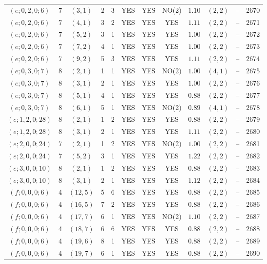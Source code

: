 \begin{longtable}{|c|c|c|c|c|c|c|c|c|c|c|c|}
$(e;0,2,0;6)$ & 7 & $(3,1)$ & 2 & 3 & YES & YES & NO(2) & $1.10$ & $(2,2)$ & -- & 2670\\
$(e;0,2,0;6)$ & 7 & $(4,1)$ & 3 & 2 & YES & YES & YES & $1.11$ & $(2,2)$ & -- & 2671\\
$(e;0,2,0;6)$ & 7 & $(5,2)$ & 3 & 1 & YES & YES & YES & $1.00$ & $(2,2)$ & -- & 2672\\
$(e;0,2,0;6)$ & 7 & $(7,2)$ & 4 & 1 & YES & YES & YES & $1.00$ & $(2,2)$ & -- & 2673\\
$(e;0,2,0;6)$ & 7 & $(9,2)$ & 5 & 3 & YES & YES & YES & $1.11$ & $(2,2)$ & -- & 2674\\
$(e;0,3,0;7)$ & 8 & $(2,1)$ & 1 & 1 & YES & YES & NO(2) & $1.00$ & $(4,1)$ & -- & 2675\\
$(e;0,3,0;7)$ & 8 & $(3,1)$ & 2 & 1 & YES & YES & YES & $1.00$ & $(2,2)$ & -- & 2676\\
$(e;0,3,0;7)$ & 8 & $(5,1)$ & 4 & 1 & YES & YES & YES & $0.88$ & $(2,2)$ & -- & 2677\\
$(e;0,3,0;7)$ & 8 & $(6,1)$ & 5 & 1 & YES & YES & NO(2) & $0.89$ & $(4,1)$ & -- & 2678\\
$(e;1,2,0;28)$ & 8 & $(2,1)$ & 1 & 2 & YES & YES & YES & $0.88$ & $(2,2)$ & -- & 2679\\
$(e;1,2,0;28)$ & 8 & $(3,1)$ & 2 & 1 & YES & YES & YES & $1.11$ & $(2,2)$ & -- & 2680\\
$(e;2,0,0;24)$ & 7 & $(2,1)$ & 1 & 2 & YES & YES & NO(2) & $1.00$ & $(2,2)$ & -- & 2681\\
$(e;2,0,0;24)$ & 7 & $(5,2)$ & 3 & 1 & YES & YES & YES & $1.22$ & $(2,2)$ & -- & 2682\\
$(e;3,0,0;10)$ & 8 & $(2,1)$ & 1 & 2 & YES & YES & YES & $0.88$ & $(2,2)$ & -- & 2683\\
$(e;3,0,0;10)$ & 8 & $(3,1)$ & 2 & 1 & YES & YES & YES & $1.12$ & $(2,2)$ & -- & 2684\\
$(f;0,0,0;6)$ & 4 & $(12,5)$ & 5 & 6 & YES & YES & YES & $0.88$ & $(2,2)$ & -- & 2685\\
$(f;0,0,0;6)$ & 4 & $(16,5)$ & 7 & 2 & YES & YES & YES & $0.88$ & $(2,2)$ & -- & 2686\\
$(f;0,0,0;6)$ & 4 & $(17,7)$ & 6 & 1 & YES & YES & NO(2) & $1.10$ & $(2,2)$ & -- & 2687\\
$(f;0,0,0;6)$ & 4 & $(18,7)$ & 6 & 6 & YES & YES & YES & $0.88$ & $(2,2)$ & -- & 2688\\
$(f;0,0,0;6)$ & 4 & $(19,6)$ & 8 & 1 & YES & YES & YES & $0.88$ & $(2,2)$ & -- & 2689\\
$(f;0,0,0;6)$ & 4 & $(19,7)$ & 6 & 1 & YES & YES & YES & $0.88$ & $(2,2)$ & -- & 2690\\

\end{longtable}
